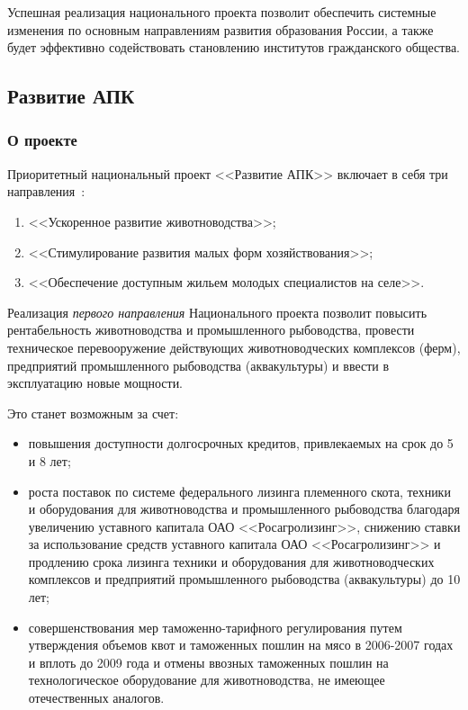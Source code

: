 \documentclass[article, 12pt, russian, oneside]{ncc}
\begin{document}
Успешная реализация национального проекта позволит обеспечить
системные изменения по основным направлениям развития образования
России, а также будет эффективно содействовать становлению институтов
гражданского общества.

\subsection{Развитие АПК}

\subsubsection{О проекте}

Приоритетный национальный проект <<Развитие АПК>> включает в себя три
направления~\cite{APK_Problems}:

\begin{enumerate}
\item <<Ускоренное развитие животноводства>>;
\item <<Стимулирование развития малых форм хозяйствования>>;
\item <<Обеспечение доступным жильем молодых специалистов на селе>>.
\end{enumerate}

Реализация \emph{первого направления} Национального проекта позволит
повысить рентабельность животноводства и промышленного рыбоводства,
провести техническое перевооружение действующих животноводческих
комплексов (ферм), предприятий промышленного рыбоводства
(аквакультуры) и ввести в эксплуатацию новые мощности.

Это станет возможным за счет:

\begin{itemize}
\item повышения доступности долгосрочных кредитов, привлекаемых на
  срок до 5 и 8 лет;
\item роста поставок по системе федерального лизинга племенного скота,
  техники и оборудования для животноводства и промышленного
  рыбоводства благодаря увеличению уставного капитала ОАО
  <<Росагролизинг>>, снижению ставки за использование средств
  уставного капитала ОАО <<Росагролизинг>> и продлению срока лизинга
  техники и оборудования для животноводческих комплексов и предприятий
  промышленного рыбоводства (аквакультуры) до 10 лет;
\item совершенствования мер таможенно-тарифного регулирования путем
  утверждения объемов квот и таможенных пошлин на мясо в 2006-2007
  годах и вплоть до 2009 года и отмены ввозных таможенных пошлин на
  технологическое оборудование для животноводства, не имеющее
  отечественных аналогов.
\end{itemize}
\end{document}
